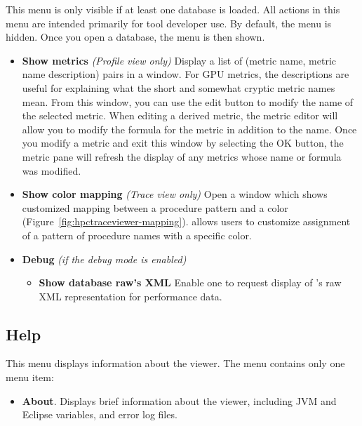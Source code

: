 This menu is only visible if at least one database is loaded.
All actions in this menu are intended primarily for tool developer use.
By default, the menu is hidden. Once you open a database, the menu is then shown.

\begin{itemize}

 \item \textbf{Show metrics}   \textit{(Profile view only)}
 Display a list of (metric name, metric name description) pairs in a window. For GPU metrics, the descriptions are useful for explaining what the short and somewhat cryptic metric names mean.
 From this window, you can use the edit button to modify the name of the selected metric. When editing a derived metric, the metric editor will allow you to modify the formula for the metric in addition to the name.
 Once you modify a metric and exit this window by selecting the OK button, the metric pane will refresh the display of any metrics whose name or formula was modified.

 \item \textbf{Show color mapping} \textit{(Trace view only)}
  Open a window which shows customized mapping between a procedure pattern and a color (Figure~\ref{fig:hpctraceviewer-mapping}). \hpctraceviewer{} allows users to customize assignment of a pattern of procedure names with a specific color.

 \item \textbf{Debug} \emph{(if the debug mode is enabled)}

   \begin{itemize}
     \item \textbf{Show database raw's XML}
 	Enable one to request display of \HPCToolkit{}'s raw XML representation for performance data.

  \end{itemize}

\end{itemize}

\subsection{Help}

This menu displays information about the viewer. The menu contains only one menu item:
\begin{itemize}

\item \textbf{About}.
  Displays brief information about the viewer, including JVM and Eclipse variables, and error log files.

\end{itemize}


